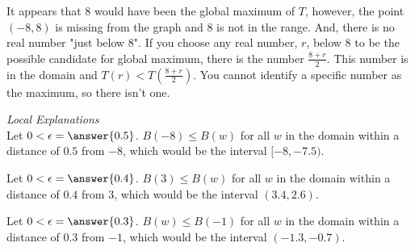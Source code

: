 \documentclass{ximera}
\begin{document}
It appears that $8$ would have been the global maximum of $T$, however, the point $(-8, 8)$ is missing from the graph and $8$ is not in the range.  And, there is no real number "just below $8$".  If you choose any real number, $r$, below $8$ to be the possible candidate for global maximum, there is the number $\frac{8+r}{2}$. This number is in the domain and $T(r) < T\left(\frac{8+r}{2}\right)$.  You cannot identify a specific number as the maximum, so there isn't one.




\textit{Local Explanations} \\

Let $0 < \epsilon = \answer{0.5}$.  $B(-8) \leq B(w)$ for all $w$ in the domain within a distance of $0.5$ from $-8$, which would be the interval $[-8, -7.5)$.

Let $0 < \epsilon = \answer{0.4}$.  $B(3) \leq B(w)$ for all $w$ in the domain within a distance of $0.4$ from $3$, which would be the interval $(3.4, 2.6)$.

Let $0 < \epsilon = \answer{0.3}$.  $B(w) \leq B(-1)$ for all $w$ in the domain within a distance of $0.3$ from $-1$, which would be the interval $(-1.3, -0.7)$.
\end{document}
